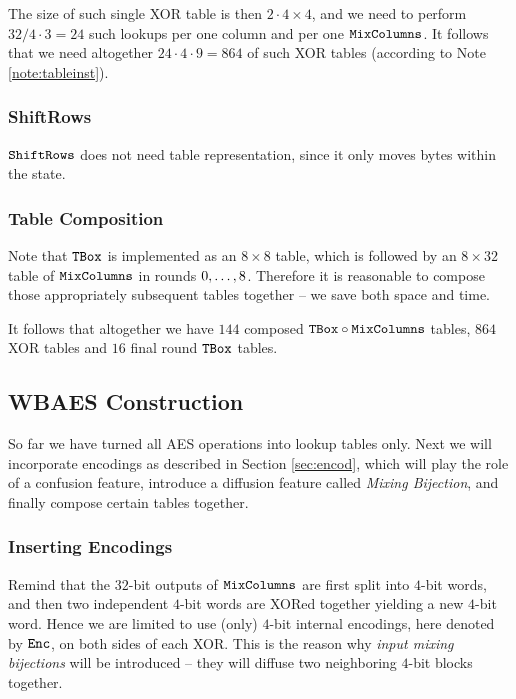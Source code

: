 	The size of such single XOR table is then $2\cdot 4\times 4$, and we need to perform $32/4\cdot 3=24$ such lookups per one column and per one $\texttt{MixColumns}$. It follows that we need altogether $24\cdot 4\cdot 9 = 864$ of such XOR tables (according to Note \ref{note:tableinst}).

\subsubsection{ShiftRows}
	
	$\texttt{ShiftRows}$ does not need table representation, since it only moves bytes within the state.

\subsubsection{Table Composition}
	
	Note that $\texttt{TBox}$ is implemented as an $8\times 8$ table, which is followed by an $8\times 32$ table of $\texttt{MixColumns}$ in rounds $0 , \ldots , 8$. Therefore it is reasonable to compose those appropriately subsequent tables together -- we save both space and time.
	
	It follows that altogether we have $144$ composed $\texttt{TBox}\circ\texttt{MixColumns}$ tables, $864$ XOR tables and $16$ final round $\texttt{TBox}$ tables.



\subsection{WBAES Construction}
\label{sec:constrwbaes}

So far we have turned all AES operations into lookup tables only. Next we will incorporate encodings as described in Section \ref{sec:encod}, which will play the role of a confusion feature, introduce a diffusion feature called {\em Mixing Bijection}, and finally compose certain tables together.

\subsubsection{Inserting Encodings}
	
	Remind that the $32$-bit outputs of $\texttt{MixColumns}$ are first split into $4$-bit words, and then two independent $4$-bit words are XORed together yielding a new $4$-bit word. Hence we are limited to use (only) $4$-bit internal encodings, here denoted by $\texttt{Enc}$, on both sides of each XOR. This is the reason why {\em input mixing bijections} will be introduced -- they will diffuse two neighboring $4$-bit blocks together.
	
